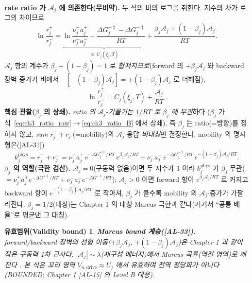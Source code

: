 \documentclass[11pt,a4paper]{article}
\newtheorem*{boundbox}{유효범위(Validity bound)}
\newcommand{\drive}{\mathrm{drive}}
\newcommand{\AL}[1]{\textsf{[AL-#1]}}
\begin{document}
\textbf{rate ratio 가 $\mathcal A_j$ 에 의존한다(무비약).} 두 식의 비의 로그를 취한다. 지수의 차가 로그의 차이므로
\begin{equation}
\ln\frac{r_j^+}{r_j^-}=\underbrace{\ln\frac{\nu_j^+a_j^+}{\nu_j^-a_j^-}-\frac{\Delta G_j^{+\ddagger}-\Delta G_j^{-\ddagger}}{RT}}_{\equiv\,C_j(\xi_j,T)}
+\frac{\beta_j\mathcal A_j+(1-\beta_j)\mathcal A_j}{RT}.
\label{eq:ch3_ratio_raw}
\end{equation}
$\mathcal A_j$ 항의 계수가 $\beta_j+(1-\beta_j)=1$ 로 \emph{합쳐지므로}(forward 의 $+\beta_j\mathcal A_j$ 와
backward 장벽 증가가 비에서 $-[-(1-\beta_j)\mathcal A_j]=+(1-\beta_j)\mathcal A_j$ 로 더해짐),
\begin{equation}
\boxed{\;\ln\frac{r_j^+}{r_j^-}=C_j(\xi_j,T)+\frac{\mathcal A_j}{RT}\;.}
\label{eq:ch3_ratio_B}
\end{equation}
\textbf{핵심 관찰($\beta_j$ 의 상쇄).} \emph{ratio 의 $\mathcal A_j$-기울기는 $1/RT$ 로 $\beta_j$ 에 무관}하다
($\beta_j$ 가 식~\eqref{eq:ch3_ratio_raw}$\to$\eqref{eq:ch3_ratio_B} 에서 상쇄). 즉 $\beta_j$ 는 ratio(=방향)를
정하지 않고, \emph{sum} $r_j^++r_j^-$(=mobility)의 $\mathcal A_j$-응답 \emph{비대칭}만 결정한다. mobility 의
명시형은(\AL{31})
\begin{equation}
k_j^{\mathrm{phys}}=r_j^++r_j^-
=\nu_j^+a_j^+\,e^{-\Delta G_j^{+\ddagger}/RT}\,e^{\beta_j\mathcal A_j/RT}
+\nu_j^-a_j^-\,e^{-\Delta G_j^{-\ddagger}/RT}\,e^{-(1-\beta_j)\mathcal A_j/RT}.
\label{eq:ch3_ksum}
\end{equation}
\textbf{$\beta_j$ 의 역할(극한 검산).} $\mathcal A_j=0$(구동력 없음)이면 두 지수가 $1$ 이라 $k_j^{\mathrm{phys}}$ 가
$\beta_j$ 무관($=\nu_j^+a_j^+e^{-\Delta G^{+\ddagger}/RT}+\nu_j^-a_j^-e^{-\Delta G^{-\ddagger}/RT}$); $\mathcal A_j>0$
이면 forward 항이 $e^{\beta_j\mathcal A_j/RT}$ 로 커지고 backward 항이 $e^{-(1-\beta_j)\mathcal A_j/RT}$ 로 작아져,
$\beta_j$ 가 클수록 mobility 의 $\mathcal A_j$-증가가 가팔라진다. $\beta_j=1/2$(대칭)는 Chapter 1 의 대칭 Marcus
극한과 같다(거기서 ``공통 배율''로 평균낸 그 대칭).
\begin{boundbox}
\textbf{Marcus bound 계승(\AL{33}).} forward/backward 장벽의 \emph{선형} 이동($\mp\beta_j\mathcal A_j$,
$\mp(1-\beta_j)\mathcal A_j$)은 Chapter 1 과 같이 작은 구동력 1차 근사다. $|\mathcal A_j|\sim\lambda$(재구성
에너지)에서 Marcus 곡률(역전 영역)로 깨진다 \cite{marcus1956}. 본 식은 꼬리 영역 $V_{n,\drive}\approx U_j$ 에서
유효하며 전역 정당화가 아니다(BOUNDED; Chapter 1 \AL{15} 의 Level B 대응).
\end{boundbox}
\end{document}
